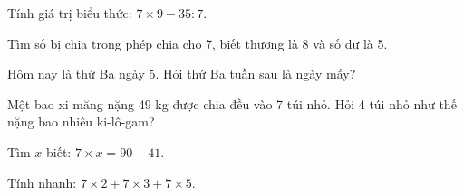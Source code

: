 \begin{ex} %
Tính giá trị biểu thức: $7 \times 9 - 35 : 7$.
\end{ex}

\begin{ex} %
Tìm số bị chia trong phép chia cho 7, biết thương là 8 và số dư là 5.
\end{ex}

\begin{ex} %
Hôm nay là thứ Ba ngày 5. Hỏi thứ Ba tuần sau là ngày mấy?
\end{ex}

\begin{ex} %
Một bao xi măng nặng 49 kg được chia đều vào 7 túi nhỏ. Hỏi 4 túi nhỏ như thế nặng bao nhiêu ki-lô-gam?
\end{ex}

\begin{ex} %
Tìm $x$ biết: $7 \times x = 90 - 41$.
\end{ex}

\begin{ex} %
Tính nhanh: $7 \times 2 + 7 \times 3 + 7 \times 5$.
\end{ex}
